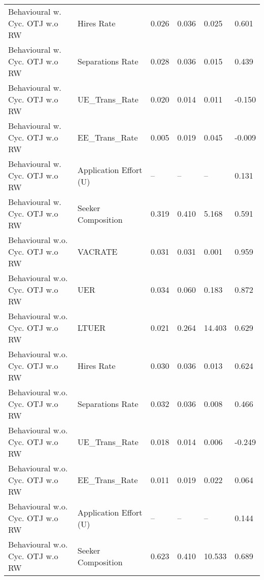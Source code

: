 \begin{table}[ht]
\begin{adjustbox}{width=\textwidth}
\begin{tabular}{llllll}
Behavioural w. Cyc. OTJ w.o RW & Hires Rate & 0.026 & 0.036 & 0.025 & 0.601 \\
Behavioural w. Cyc. OTJ w.o RW & Separations Rate & 0.028 & 0.036 & 0.015 & 0.439 \\
Behavioural w. Cyc. OTJ w.o RW & UE_Trans_Rate & 0.020 & 0.014 & 0.011 & -0.150 \\
Behavioural w. Cyc. OTJ w.o RW & EE_Trans_Rate & 0.005 & 0.019 & 0.045 & -0.009 \\
Behavioural w. Cyc. OTJ w.o RW & Application Effort (U) & -- & -- & -- & 0.131 \\
Behavioural w. Cyc. OTJ w.o RW & Seeker Composition & 0.319 & 0.410 & 5.168 & 0.591 \\
Behavioural w.o. Cyc. OTJ w.o RW & VACRATE & 0.031 & 0.031 & 0.001 & 0.959 \\
Behavioural w.o. Cyc. OTJ w.o RW & UER & 0.034 & 0.060 & 0.183 & 0.872 \\
Behavioural w.o. Cyc. OTJ w.o RW & LTUER & 0.021 & 0.264 & 14.403 & 0.629 \\
Behavioural w.o. Cyc. OTJ w.o RW & Hires Rate & 0.030 & 0.036 & 0.013 & 0.624 \\
Behavioural w.o. Cyc. OTJ w.o RW & Separations Rate & 0.032 & 0.036 & 0.008 & 0.466 \\
Behavioural w.o. Cyc. OTJ w.o RW & UE_Trans_Rate & 0.018 & 0.014 & 0.006 & -0.249 \\
Behavioural w.o. Cyc. OTJ w.o RW & EE_Trans_Rate & \cellcolor{yellow!25}0.011 & 0.019 & \cellcolor{yellow!25}0.022 & 0.064 \\
Behavioural w.o. Cyc. OTJ w.o RW & Application Effort (U) & -- & -- & -- & 0.144 \\
Behavioural w.o. Cyc. OTJ w.o RW & Seeker Composition & 0.623 & 0.410 & 10.533 & 0.689 \\
\bottomrule
\end{tabular}
\end{adjustbox}
\end{table}
